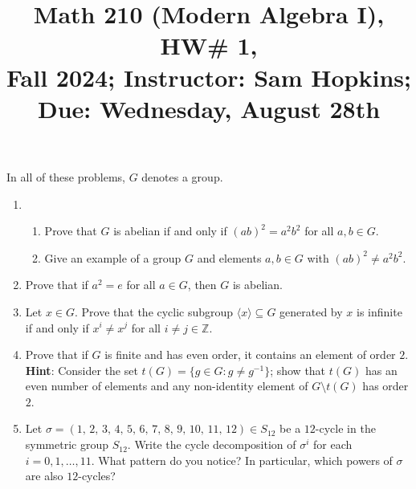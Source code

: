 \documentclass[11pt]{article}
\title{Math 210 (Modern Algebra I), HW\# 1, \\ {\normalsize Fall 2024; Instructor: Sam Hopkins; Due: Wednesday, August 28th}}
\date{}
\begin{document}
\maketitle

\thispagestyle{empty}

In all of these problems, $G$ denotes a group.

\begin{enumerate}

\item \begin{enumerate}
\item Prove that $G$ is abelian if and only if $(ab)^2=a^2b^2$ for all $a,b\in G$. 
\item Give an example of a group $G$ and elements $a,b\in G$ with $(ab)^2\neq a^2b^2$.
\end{enumerate}

\item Prove that if $a^2 = e$ for all $a\in G$, then $G$ is abelian.

\item Let $x\in G$. Prove that the cyclic subgroup $\langle x \rangle \subseteq G$ generated by $x$ is infinite if and only if $x^{i} \neq x^{j}$ for all $i \neq j \in \mathbb{Z}$.

\item Prove that if $G$ is finite and has even order, it contains an element of order $2$. \\ {\bf Hint}: Consider the set $t(G) = \{g \in G\colon g \neq g^{-1}\}$; show that $t(G)$ has an even number of elements and any non-identity element of $G\setminus t(G)$ has order $2$.

\item Let $\sigma = (1, \, 2, \, 3, \, 4, \, 5, \, 6, \, 7, \, 8, \, 9, \, 10, \, 11, \, 12) \in S_{12}$ be a $12$-cycle in the symmetric group $S_{12}$. Write the cycle decomposition of $\sigma^i$ for each $i=0,1,\ldots,11$. What pattern do you notice? In particular, which powers of $\sigma$ are also $12$-cycles?

\end{enumerate}
\end{document}
